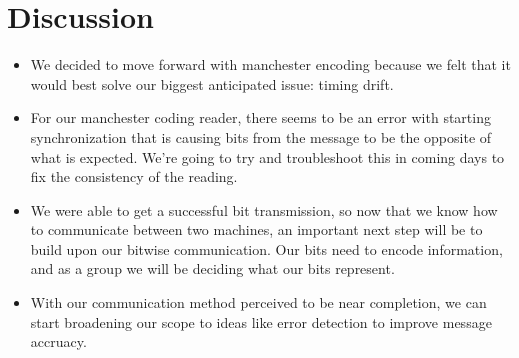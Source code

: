 \documentclass{article}
\begin{document}
\section*{Discussion}
\begin{itemize}
\item We decided to move forward with manchester encoding because we felt that it would best solve our biggest anticipated issue: timing drift.
\item For our manchester coding reader, there seems to be an error with starting synchronization that is causing bits from the message to be the opposite of what is expected.
We're going to try and troubleshoot this in coming days to fix the consistency of the reading.
\item We were able to get a successful bit transmission, so now that we know how to communicate between two machines, an important
next step will be to build upon our bitwise communication. Our bits need to encode information, and as a group we will be deciding 
what our bits represent.
\item With our communication method perceived to be near completion, we can start broadening our scope to ideas like error detection to improve message accruacy.
\end{itemize}

\end{document}
